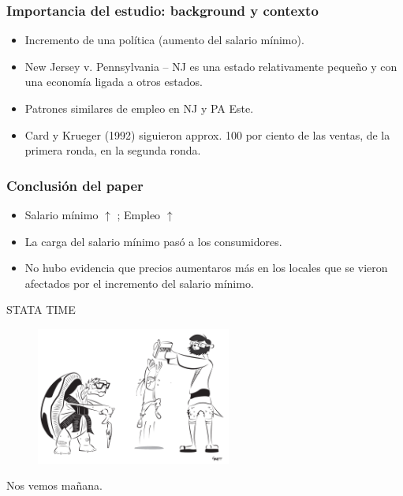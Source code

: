\documentclass[10pt, aspectratio=169, compress]{beamer}
\makeatletter
\def\beamer@writeslidentry@miniframesoff{%
	\expandafter\beamer@ifempty\expandafter{\beamer@framestartpage}{}%
	{%
		\clearpage\beamer@notesactions%
	}
}
\newcommand*{\miniframesoff}{\let\beamer@writeslidentry=\beamer@writeslidentry@miniframesoff}
\makeatother
\begin{document}
\begin{frame}
	\frametitle{Importancia del estudio: background y contexto}

	\begin{itemize}
		\item Incremento de una política (aumento del salario mínimo).
		\item New Jersey v. Pennsylvania -- NJ es una estado relativamente pequeño y con una economía ligada a otros estados.
		\item Patrones similares de empleo en NJ y PA Este.
		\item Card y Krueger (1992) siguieron approx. 100 por ciento de las ventas, de la primera ronda, en la segunda ronda.  
	\end{itemize}
\end{frame}
\begin{frame}
	\frametitle{Conclusión del paper}

	\begin{itemize}
		\item Salario mínimo $\uparrow$ ; Empleo $\uparrow$
		\item La carga del salario mínimo pasó a los consumidores.
		\item No hubo evidencia que precios aumentaros más en los locales que se vieron afectados por el incremento del salario mínimo.
	\end{itemize}

\end{frame}
\miniframesoff 	
\begin{frame}
	\begin{center}
	\LARGE STATA TIME
		\begin{figure}[H]
			\includegraphics[width=0.57\textwidth]{stata.pdf}
		\end{figure}
	\end{center}
\end{frame}
\begin{frame}
	Nos vemos mañana.
\end{frame}
\end{document}
